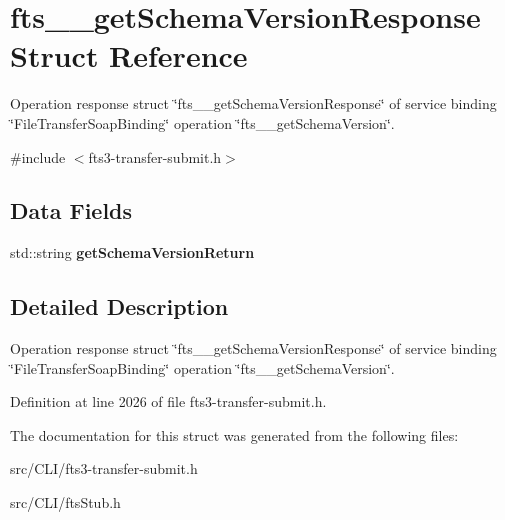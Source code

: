 \section{fts\_\-\_\-getSchemaVersionResponse Struct Reference}
\label{structfts____getSchemaVersionResponse}


Operation response struct \char`\"{}fts\_\-\_\-getSchemaVersionResponse\char`\"{} of service binding \char`\"{}FileTransferSoapBinding\char`\"{} operation \char`\"{}fts\_\-\_\-getSchemaVersion\char`\"{}.  




{\ttfamily \#include $<$fts3-\/transfer-\/submit.h$>$}

\subsection*{Data Fields}
\begin{DoxyCompactItemize}
\item 
std::string {\bfseries getSchemaVersionReturn}\label{structfts____getSchemaVersionResponse_a52b467123918080700b54ac7aeb2b24e}

\end{DoxyCompactItemize}


\subsection{Detailed Description}
Operation response struct \char`\"{}fts\_\-\_\-getSchemaVersionResponse\char`\"{} of service binding \char`\"{}FileTransferSoapBinding\char`\"{} operation \char`\"{}fts\_\-\_\-getSchemaVersion\char`\"{}. 

Definition at line 2026 of file fts3-\/transfer-\/submit.h.



The documentation for this struct was generated from the following files:\begin{DoxyCompactItemize}
\item 
src/CLI/fts3-\/transfer-\/submit.h\item 
src/CLI/ftsStub.h\end{DoxyCompactItemize}
